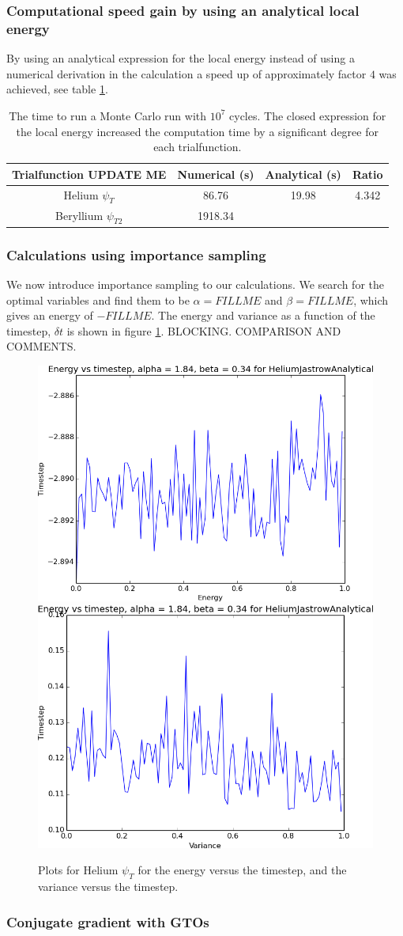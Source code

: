 		\subsubsection{Computational speed gain by using an analytical local energy}
			By using an analytical expression for the local energy instead of using a numerical derivation in the calculation a speed up of approximately factor \(4\) was achieved, see table \ref{tab:analyticVSNumeric}.

			\begin{table}
				\center
				\begin{tabular}{| c | c | c | c |}
				    \hline
				   	\textbf{Trialfunction UPDATE ME} & Numerical (s) & Analytical (s) & Ratio
				    \\ \hline
				    Helium $\psi_{T}$ & 86.76 & 19.98	& 4.342
				    \\	\hline
				    Beryllium $\psi_{T2}$ & 1918.34  &	 &
					    \\ \hline
				\end{tabular}
				\caption{The time to run a Monte Carlo run with \(10^7\) cycles. The closed expression for the local energy increased the computation time by a significant degree for each trialfunction. }
				\label{tab:analyticVSNumeric}
			\end{table}

		\subsubsection{Calculations using importance sampling}
			We now introduce importance sampling to our calculations. We search for the optimal variables and find them to be $\alpha=FILLME$ and $\beta=FILLME$, which gives an energy of $-FILLME$. The energy and variance as a function of the timestep, $\delta t$ is shown in figure \ref{fig:HeliumTimestep}. BLOCKING. COMPARISON AND COMMENTS. 

			\begin{figure}
				\centering \includegraphics[width=0.45\linewidth]{../figures/HeliumJastrowAnalyticalTimeEnergy}
				\includegraphics[width=0.45\linewidth]{../figures/HeliumJastrowAnalyticalTimeVariance}
				\protect\caption{Plots for Helium $\psi_{T}$ for the energy versus the timestep, and the variance versus the timestep.}
				\label{fig:HeliumTimestep}
			\end{figure}


		\subsubsection{Conjugate gradient with GTOs}